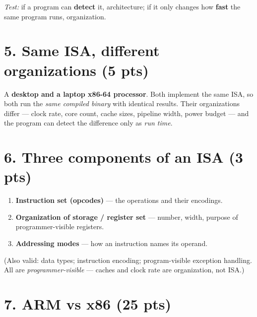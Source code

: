 \emph{Test:} if a program can \textbf{detect} it, architecture; if it only
changes how \textbf{fast} the same program runs, organization.

\section*{5. Same ISA, different organizations \normalsize(5 pts)}

A \textbf{desktop and a laptop x86-64 processor}. Both implement the same ISA, so
both run the \emph{same compiled binary} with identical results. Their
organizations differ — clock rate, core count, cache sizes, pipeline width,
power budget — and the program can detect the difference only as \emph{run
time}.

\section*{6. Three components of an ISA \normalsize(3 pts)}

\begin{enumerate}[nosep, leftmargin=1.6em]
  \item \textbf{Instruction set (opcodes)} — the operations and their encodings.
  \item \textbf{Organization of storage / register set} — number, width, purpose
    of programmer-visible registers.
  \item \textbf{Addressing modes} — how an instruction names its operand.
\end{enumerate}
{\small(Also valid: data types; instruction encoding; program-visible exception
handling. All are \emph{programmer-visible} — caches and clock rate are
organization, not ISA.)}

\section*{7. ARM vs x86 \normalsize(25 pts)}

